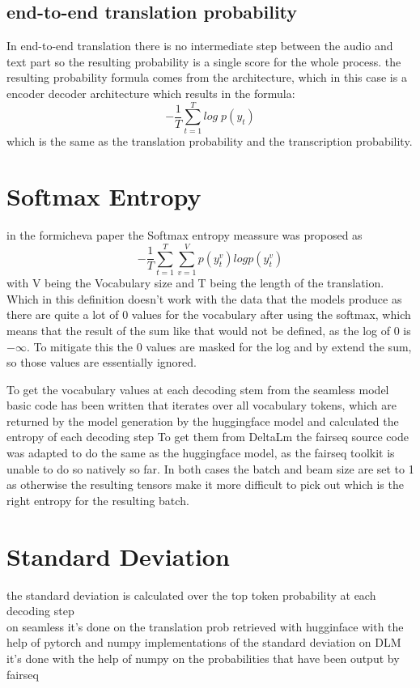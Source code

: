 \subsection{end-to-end translation probability}
In end-to-end translation there is no intermediate step between the audio and text part so the resulting probability is a single score for the whole process.
the resulting probability formula comes from the architecture, which in this case is a encoder decoder architecture which results in the formula: $$-\frac{1}{T}\sum_{t=1}^T log\; p(y_t)$$ which is the same as the translation probability and the transcription probability. 

\section{Softmax Entropy}
in the formicheva \cite{fomicheva2020unsupervised} paper the Softmax entropy meassure was proposed as $$-\frac{1}{T}\sum_{t=1}^T\sum_{v=1}^Vp(y_t^v)logp(y_t^v)$$ with V being the Vocabulary size and T being the length of the translation. Which in this definition doesn't work with the data that the models produce as there are quite a lot of 0 values for the vocabulary after using the softmax, which means that the result of the sum like that would not be defined, as the log of 0 is $-\infty$. To mitigate this the 0 values are masked for the log and by extend the sum, so those values are essentially ignored. 

To get the vocabulary values at each decoding stem from the seamless model basic code has been written that iterates over all vocabulary tokens, which are returned by the model generation by the huggingface model and calculated the entropy of each decoding step
To get them from DeltaLm the fairseq source code was adapted to do the same as the huggingface model, as the fairseq toolkit is unable to do so natively so far. 
In both cases the batch and beam size are set to 1 as otherwise the resulting tensors make it more difficult to pick out which is the right entropy for the resulting batch. 

\section{Standard Deviation}
the standard deviation is calculated over the top token probability at each decoding step\\
on seamless it's done on the translation prob retrieved with hugginface with the help of pytorch and numpy implementations of the standard deviation
on DLM it's done with the help of numpy on the probabilities that have been output by fairseq


